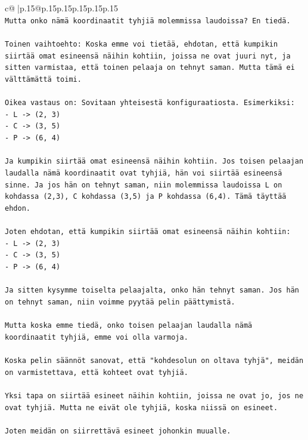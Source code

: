 \documentclass{article}
\begin{document}
{\begin{supertabular}{c@{$\;$}|p{.15\linewidth}@{}p{.15\linewidth}p{.15\linewidth}p{.15\linewidth}p{.15\linewidth}p{.15\linewidth}}
{{{\\ 
\texttt{Mutta onko nämä koordinaatit tyhjiä molemmissa laudoissa? En tiedä.} \\
\\ 
\texttt{Toinen vaihtoehto: Koska emme voi tietää, ehdotan, että kumpikin siirtää omat esineensä näihin kohtiin, joissa ne ovat juuri nyt, ja sitten varmistaa, että toinen pelaaja on tehnyt saman. Mutta tämä ei välttämättä toimi.} \\
\\ 
\texttt{Oikea vastaus on: Sovitaan yhteisestä konfiguraatiosta. Esimerkiksi:} \\
\texttt{{-} L {-}> (2, 3)} \\
\texttt{{-} C {-}> (3, 5)} \\
\texttt{{-} P {-}> (6, 4)} \\
\\ 
\texttt{Ja kumpikin siirtää omat esineensä näihin kohtiin. Jos toisen pelaajan laudalla nämä koordinaatit ovat tyhjiä, hän voi siirtää esineensä sinne. Ja jos hän on tehnyt saman, niin molemmissa laudoissa L on kohdassa (2,3), C kohdassa (3,5) ja P kohdassa (6,4). Tämä täyttää ehdon.} \\
\\ 
\texttt{Joten ehdotan, että kumpikin siirtää omat esineensä näihin kohtiin:} \\
\texttt{{-} L {-}> (2, 3)} \\
\texttt{{-} C {-}> (3, 5)} \\
\texttt{{-} P {-}> (6, 4)} \\
\\ 
\texttt{Ja sitten kysymme toiselta pelaajalta, onko hän tehnyt saman. Jos hän on tehnyt saman, niin voimme pyytää pelin päättymistä.} \\
\\ 
\texttt{Mutta koska emme tiedä, onko toisen pelaajan laudalla nämä koordinaatit tyhjiä, emme voi olla varmoja.} \\
\\ 
\texttt{Koska pelin säännöt sanovat, että "kohdesolun on oltava tyhjä", meidän on varmistettava, että kohteet ovat tyhjiä.} \\
\\ 
\texttt{Yksi tapa on siirtää esineet näihin kohtiin, joissa ne ovat jo, jos ne ovat tyhjiä. Mutta ne eivät ole tyhjiä, koska niissä on esineet.} \\
\\ 
\texttt{Joten meidän on siirrettävä esineet johonkin muualle.} \\
}}}
\end{supertabular}}
\end{document}
